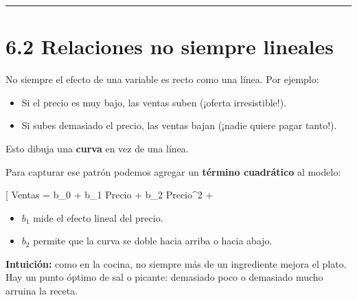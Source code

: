 \documentclass[
  spanish,
  letterpaper,
  DIV=11,
  numbers=noendperiod]{scrreprt}
\providecommand{\tightlist}{%
  \setlength{\itemsep}{0pt}\setlength{\parskip}{0pt}}
\begin{document}
\begin{center}\rule{0.5\linewidth}{0.5pt}\end{center}

\section{6.2 Relaciones no siempre
lineales}\label{relaciones-no-siempre-lineales}

No siempre el efecto de una variable es recto como una línea. Por
ejemplo:

\begin{itemize}
\tightlist
\item
  Si el precio es muy bajo, las ventas suben (¡oferta irresistible!).\\
\item
  Si subes demasiado el precio, las ventas bajan (¡nadie quiere pagar
  tanto!).
\end{itemize}

Esto dibuja una \textbf{curva} en vez de una línea.

Para capturar ese patrón podemos agregar un \textbf{término cuadrático}
al modelo:

{[} Ventas = b\_0 + b\_1 \times Precio + b\_2 \times Precio\^{}2 +
\varepsilon {]}

\begin{itemize}
\tightlist
\item
  \(b_1\) mide el efecto lineal del precio.\\
\item
  \(b_2\) permite que la curva se doble hacia arriba o hacia abajo.
\end{itemize}

\begin{tcolorbox}[enhanced jigsaw, toptitle=1mm, opacitybacktitle=0.6, leftrule=.75mm, arc=.35mm, title=\textcolor{quarto-callout-tip-color}{\faLightbulb}\hspace{0.5em}{Tip}, colback=white, bottomrule=.15mm, colbacktitle=quarto-callout-tip-color!10!white, opacityback=0, bottomtitle=1mm, breakable, rightrule=.15mm, coltitle=black, left=2mm, titlerule=0mm, colframe=quarto-callout-tip-color-frame, toprule=.15mm]

\textbf{Intuición:} como en la cocina, no siempre más de un ingrediente
mejora el plato. Hay un punto óptimo de sal o picante: demasiado poco o
demasiado mucho arruina la receta.

\end{tcolorbox}
\end{document}
